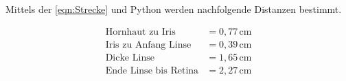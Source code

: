   Mittels der \autoref{eqn:Strecke} und Python werden nachfolgende Distanzen bestimmt.

  \begin{align*}
    \mathrm{Hornhaut \,\, zu  \,\, Iris} &= 0,77 \, \si{\centi\meter}\\
    \mathrm{Iris \,\, zu \,\, Anfang \,\, Linse} &= 0,39 \, \si{\centi\meter}\\
    \mathrm{Dicke \,\, Linse} &= 1,65 \, \si{\centi\meter}\\
    \mathrm{Ende \,\, Linse \,\, bis \,\, Retina} &= 2,27 \, \si{\centi\meter}\\
  \end{align*}
